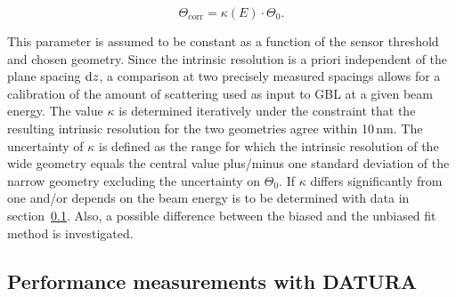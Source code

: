 \begin{equation}
 \Theta_{\textrm{corr}} = \kappa(E) \cdot \Theta_0.
 \label{eq:thetacorr}
\end{equation}

\noindent
This parameter is assumed to be constant as a function of the sensor threshold and chosen geometry. 
Since the intrinsic resolution is a priori independent of the plane spacing $\textrm{d}z$,
 a comparison at two precisely measured spacings allows for a calibration of the amount of scattering used as input to GBL at a given beam energy. 
The value $\kappa$ is determined iteratively under the constraint that the resulting intrinsic resolution for the two geometries agree within 10\,nm.
The uncertainty of $\kappa$ is defined as the range for which the intrinsic resolution of the wide geometry equals the central value plus/minus one standard deviation of the narrow geometry
 excluding the uncertainty on $\Theta_0$. 
If $\kappa$ differs significantly from one and/or depends on the beam energy is to be determined with data in section~\ref{sec:measurements}. 
Also, a possible difference between the biased and the unbiased fit method is investigated. 


\subsection{Performance measurements with DATURA}
\label{sec:measurements}

